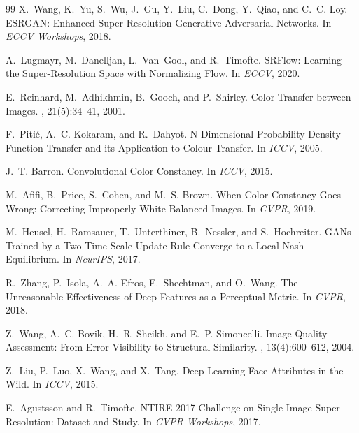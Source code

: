\documentclass[11pt]{article}
\begin{document}
\begin{thebibliography}{99}
X.~Wang, K.~Yu, S.~Wu, J.~Gu, Y.~Liu, C.~Dong, Y.~Qiao, and C.~C. Loy.
\newblock ESRGAN: Enhanced Super-Resolution Generative Adversarial Networks.
\newblock In {\em ECCV Workshops}, 2018.

A.~Lugmayr, M.~Danelljan, L.~Van~Gool, and R.~Timofte.
\newblock SRFlow: Learning the Super-Resolution Space with Normalizing Flow.
\newblock In {\em ECCV}, 2020.

E.~Reinhard, M.~Adhikhmin, B.~Gooch, and P.~Shirley.
\newblock Color Transfer between Images.
, 21(5):34--41, 2001.

F.~Piti\'e, A.~C. Kokaram, and R.~Dahyot.
\newblock N-Dimensional Probability Density Function Transfer and its
Application to Colour Transfer.
\newblock In {\em ICCV}, 2005.

J.~T. Barron.
\newblock Convolutional Color Constancy.
\newblock In {\em ICCV}, 2015.

M.~Afifi, B.~Price, S.~Cohen, and M.~S. Brown.
\newblock When Color Constancy Goes Wrong: Correcting Improperly
White-Balanced Images.
\newblock In {\em CVPR}, 2019.

M.~Heusel, H.~Ramsauer, T.~Unterthiner, B.~Nessler, and S.~Hochreiter.
\newblock GANs Trained by a Two Time-Scale Update Rule Converge to a Local Nash
Equilibrium.
\newblock In {\em NeurIPS}, 2017.

R.~Zhang, P.~Isola, A.~A. Efros, E.~Shechtman, and O.~Wang.
\newblock The Unreasonable Effectiveness of Deep Features as a Perceptual Metric.
\newblock In {\em CVPR}, 2018.

Z.~Wang, A.~C. Bovik, H.~R. Sheikh, and E.~P. Simoncelli.
\newblock Image Quality Assessment: From Error Visibility to Structural
Similarity.
, 13(4):600--612, 2004.

Z.~Liu, P.~Luo, X.~Wang, and X.~Tang.
\newblock Deep Learning Face Attributes in the Wild.
\newblock In {\em ICCV}, 2015.

E.~Agustsson and R.~Timofte.
\newblock NTIRE 2017 Challenge on Single Image Super-Resolution: Dataset and
Study.
\newblock In {\em CVPR Workshops}, 2017.

\end{thebibliography}
\end{document}
